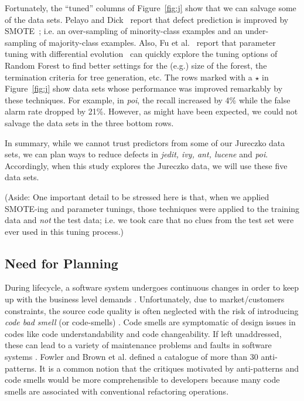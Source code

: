 \documentclass{sig-alternate}
\newcommand{\fig}[1]{Figure~\ref{fig:#1}}
\begin{document}
{\begin{itemize}[leftmargin=3mm]
Fortunately, the ``tuned'' columns of \fig{j} show that we can salvage some of the data sets. Pelayo and Dick~\cite{pelayo07} report that defect prediction is improved by SMOTE~\cite{Chawla2002}; i.e. an over-sampling of minority-class examples and an under-sampling of majority-class examples. Also, Fu et al.~\cite{fu:ase15} report that parameter tuning with differential evolution~\cite{storn97} can quickly explore the tuning options of Random Forest to find better settings for the (e.g.) size of the forest, the termination criteria
for tree generation, etc. The rows \colorbox{celadon}{marked with a $\star$} in \fig{j} show data sets whose performance was improved remarkably by these techniques. For example, in {\em poi}, the recall increased by 4\% while the false alarm rate dropped by 21\%. However,  as might have been expected, we could not salvage the data sets in the  three bottom rows.

In summary, while we cannot trust predictors from some of our Jureczko data sets,
we can plan ways to reduce defects in {\em jedit, ivy, ant, lucene} and {\em poi}.
Accordingly, when this study explores the Jureczko data, we will use these five data sets.

(Aside: One important detail to be stressed here is that, when we applied    SMOTE-ing and
parameter tunings, those techniques were applied to the training data and {\em not}
the test data; i.e. we took care that no clues from the test set were ever used in this tuning process.)





 


\subsection{Need for Planning}
During lifecycle, a software system undergoes continuous changes in order to keep up with the business level demands \cite{lehman79}. Unfortunately, due to market/customers constraints, the source code quality is often neglected with the risk of introducing \textit{code bad smell} (or code-smells) \cite{fowler09}. Code smells are symptomatic of design issues in codes like code understandability and code changeability. If left unaddressed, these can lead to a variety of maintenance problems and faults in software systems \cite{fowler09}\cite{marinescu06}. Fowler \cite{fowler09} and Brown et al. \cite{brown98} defined a catalogue of more than 30 anti-patterns. It is a common notion that the critiques motivated by anti-patterns and code smells would be more comprehensible to developers because many code smells are associated with conventional refactoring operations. 


\end{itemize}}
\end{document}
